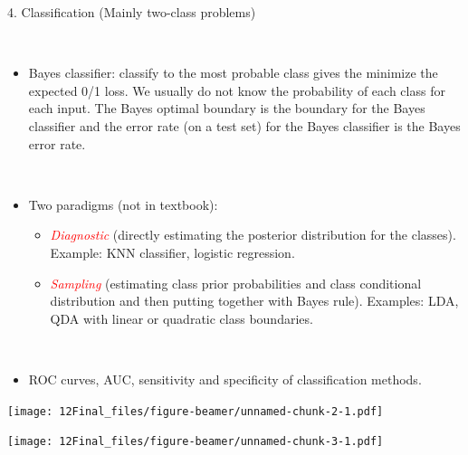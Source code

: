 \documentclass[10pt,ignorenonframetext,]{beamer}
\providecommand{\tightlist}{%
  \setlength{\itemsep}{0pt}\setlength{\parskip}{0pt}}
\begin{document}
\begin{frame}

\begin{block}{4. Classification (Mainly two-class problems)}

\(~\)

\begin{itemize}
\tightlist
\item
  Bayes classifier: classify to the most probable class gives the
  minimize the expected 0/1 loss. We usually do not know the probability
  of each class for each input. The Bayes optimal boundary is the
  boundary for the Bayes classifier and the error rate (on a test set)
  for the Bayes classifier is the Bayes error rate.
\end{itemize}

\(~\)

\begin{itemize}
\tightlist
\item
  Two paradigms (not in textbook):

  \begin{itemize}
  \tightlist
  \item
    \emph{\textcolor{red}{Diagnostic}} (directly estimating the
    posterior distribution for the classes). Example: KNN classifier,
    logistic regression.
  \item
    \emph{\textcolor{red}{Sampling}} (estimating class prior
    probabilities and class conditional distribution and then putting
    together with Bayes rule). Examples: LDA, QDA with linear or
    quadratic class boundaries.
  \end{itemize}
\end{itemize}

\(~\)

\begin{itemize}
\tightlist
\item
  ROC curves, AUC, sensitivity and specificity of classification
  methods.
\end{itemize}

\end{block}

\end{frame}

\begin{frame}

\texttt{[image: 12Final\_files/figure-beamer/unnamed-chunk-2-1.pdf]}

\end{frame}

\begin{frame}

\texttt{[image: 12Final\_files/figure-beamer/unnamed-chunk-3-1.pdf]}

\end{frame}
\end{document}
